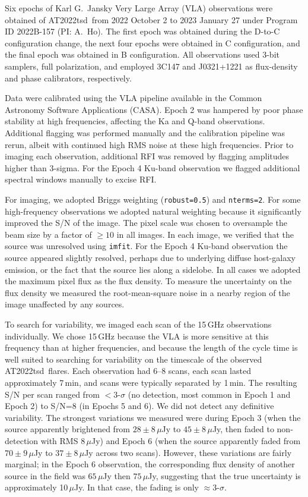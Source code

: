 \documentclass{nature_plusfigure}
\newcommand{\at}{AT2022tsd}
\begin{document}
\begin{methods}
Six epochs of Karl G.\ Jansky Very Large Array (VLA\cite{Perley2011}) observations were obtained of \at\ from 2022 October 2 to 2023 January 27 under Program ID 2022B-157 (PI: A.\ Ho).
The first epoch was obtained during the D-to-C configuration change, the next four epochs were obtained in C configuration, and the final epoch was obtained in B configuration.
All observations used 3-bit samplers, full polarization, and employed 3C147 and J0321+1221 as flux-density and phase calibrators, respectively.

Data were calibrated using the VLA pipeline available in the Common Astronomy Software Applications (CASA\cite{McMullin2007}).
Epoch 2 was hampered by poor phase stability at high frequencies, affecting the Ka and Q-band observations. Additional flagging was performed manually and the calibration pipeline was rerun, albeit with continued high RMS noise at these high frequencies.
Prior to imaging each observation, additional RFI was removed by flagging amplitudes higher than 3-sigma.
For the Epoch 4 Ku-band observation we flagged additional spectral windows manually to excise RFI.

For imaging, we adopted Briggs weighting (\texttt{robust=0.5}) and \texttt{nterms=2}. For some high-frequency observations we adopted natural weighting because it significantly improved the S/N of the image.
The pixel scale was chosen to oversample the beam size by a factor of $\geq10$ in all images.
In each image, we verified that the source was unresolved using \texttt{imfit}.
For the Epoch 4 Ku-band observation the source appeared slightly resolved, perhaps due to underlying diffuse host-galaxy emission, or the fact that the source lies along a sidelobe.
In all cases we adopted the maximum pixel flux as the flux density.
To measure the uncertainty on the flux density we measured the root-mean-square noise in a nearby region of the image unaffected by any sources.

To search for variability, we imaged each scan of the 15\,GHz observations individually. We chose 15\,GHz because the VLA is more sensitive at this frequency than at higher frequencies, and because the length of the cycle time is well suited to searching for variability on the timescale of the observed \at\ flares. Each observation had 6--8 scans, each scan lasted approximately 7\,min, and scans were typically separated by 1\,min. The resulting S/N per scan ranged from $<3$-$\sigma$ (no detection, most common in Epoch 1 and Epoch 2) to S/N=8 (in Epochs 5 and 6).
We did not detect any definitive variability. The strongest variations we measured were during Epoch 3 (when the source apparently brightened from $28\pm8\,\mu$Jy to $45\pm8\,\mu$Jy, then faded to non-detection with RMS $8\,\mu$Jy) and Epoch 6 (when the source apparently faded from $70\pm9\,\mu$Jy to $37\pm8\,\mu$Jy across two scans). However, these variations are fairly marginal; in the Epoch 6 observation, the corresponding flux density of another source in the field was $65\,\mu$Jy then $75\,\mu$Jy, suggesting that the true uncertainty is approximately 10$\,\mu$Jy. In that case, the fading is only $\approx3$-$\sigma$.


\end{methods}
\end{document}
